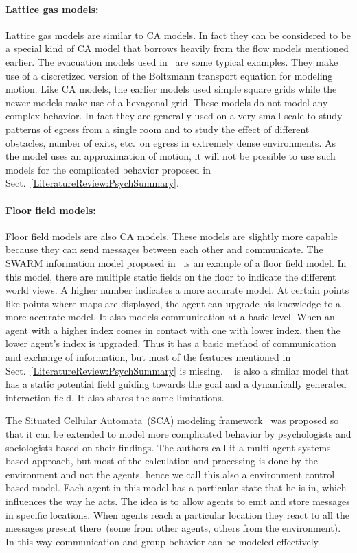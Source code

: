 \paragraph{Lattice gas models:}
Lattice gas models are similar to CA models. In fact they can be considered to be a special kind of CA model that borrows heavily from the flow models mentioned earlier. The evacuation models used in~\cite{Marconi:2002ue,Nagai:2004kl} are some typical examples. They make use of a discretized version of the Boltzmann transport equation for modeling motion. Like CA models, the earlier models used simple square grids while the newer models make use of a hexagonal grid. These models do not model any complex behavior. In fact they are generally used on a very small scale to study patterns of egress from a single room and to study the effect of different obstacles, number of exits, etc.\ on egress in extremely dense environments. As the model uses an approximation of motion, it will not be possible to use such models for the complicated behavior proposed in Sect.~\ref{LiteratureReview:PsychSummary}.



\paragraph{Floor field models:}
Floor field models are also CA models. These models are slightly more capable because they can send messages between each other and communicate. The SWARM information model proposed in~\cite{Henein:2006jq} is an example of a floor field model. In this model, there are multiple static fields on the floor to indicate the different world views. A higher number indicates a more accurate model. At certain points like points where maps are displayed, the agent can upgrade his knowledge to a more accurate model. It also models communication at a basic level. When an agent with a higher index comes in contact with one with lower index, then the lower agent's index is upgraded. Thus it has a basic method of communication and exchange of information, but most of the features mentioned in Sect.~\ref{LiteratureReview:PsychSummary} is missing. ~\cite{Qi:2011kv} is also a similar model that has a static potential field guiding towards the goal and a dynamically generated interaction field. It also shares the same limitations.

The Situated Cellular Automata~(SCA) modeling framework~\cite{Bandini:2007fa} was proposed so that it can be extended to model more complicated behavior by psychologists and sociologists based on their findings. The authors call it a multi-agent systems based approach, but most of the calculation and processing is done by the environment and not the agents, hence we call this also a environment control based model. Each agent in this model has a particular state that he is in, which influences the way he acts. The idea is to allow agents to emit and store messages in specific locations. When agents reach a particular location they react to all the messages present there~(some from other agents, others from the environment). In this way communication and group behavior can be modeled effectively.

